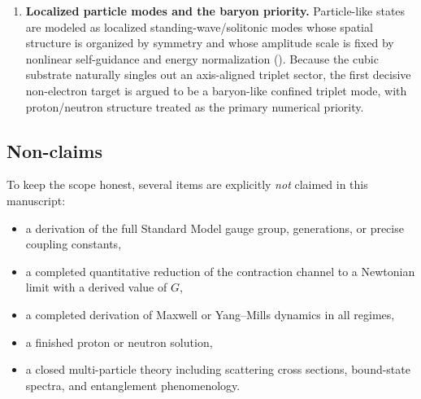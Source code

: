 \begin{enumerate}
\item \textbf{Localized particle modes and the baryon priority.}
Particle-like states are modeled as localized standing-wave/solitonic modes whose spatial structure is organized by
symmetry and whose amplitude scale is fixed by nonlinear self-guidance and energy normalization ().
Because the cubic substrate naturally singles out an axis-aligned triplet sector, the first decisive non-electron target
is argued to be a baryon-like confined triplet mode, with proton/neutron structure treated as the primary numerical
priority.
\end{enumerate}

\subsection{Non-claims}
To keep the scope honest, several items are explicitly \emph{not} claimed in this manuscript:
\begin{itemize}
\item a derivation of the full Standard Model gauge group, generations, or precise coupling constants,
\item a completed quantitative reduction of the contraction channel to a Newtonian limit with a derived value of $G$,
\item a completed derivation of Maxwell or Yang--Mills dynamics in all regimes,
\item a finished proton or neutron solution,
\item a closed multi-particle theory including scattering cross sections, bound-state spectra, and entanglement
phenomenology.
\end{itemize}


